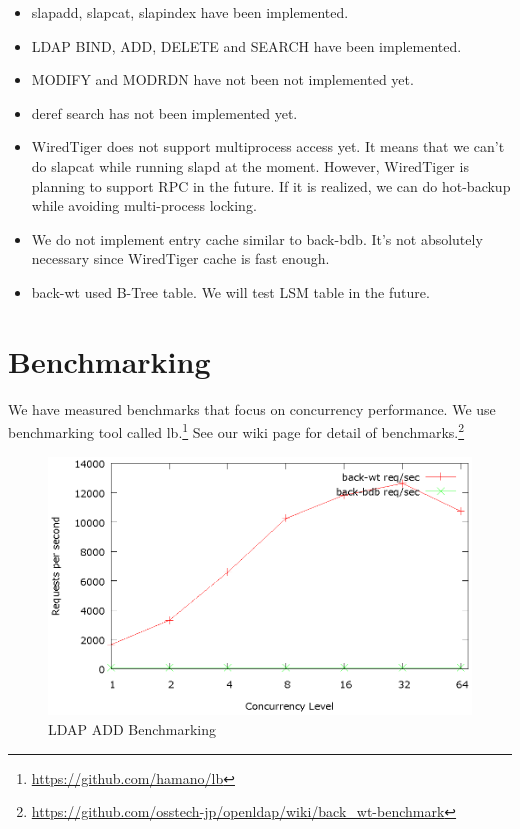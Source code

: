 \documentclass[a4paper
,12
,twocolumn
]{article}
\begin{document}
\begin{itemize}
\itemsep1pt\parskip0pt
\item
  slapadd, slapcat, slapindex have been implemented.
\item
  LDAP BIND, ADD, DELETE and SEARCH have been implemented.
\item
  MODIFY and MODRDN have not been not implemented yet.
\item
  deref search has not been implemented yet.
\item
  WiredTiger does not support multiprocess access yet. It means that we
  can't do slapcat while running slapd at the moment. However,
  WiredTiger is planning to support RPC in the future. If it is
  realized, we can do hot-backup while avoiding multi-process locking.
\item
  We do not implement entry cache similar to back-bdb. It's not
  absolutely necessary since WiredTiger cache is fast enough.
\item
  back-wt used B-Tree table. We will test LSM table in the future.
\end{itemize}

\section{Benchmarking}\label{benchmarking}

We have measured benchmarks that focus on concurrency performance. We
use benchmarking tool called lb.\footnote{\url{https://github.com/hamano/lb}}
See our wiki page for detail of benchmarks.\footnote{\url{https://github.com/osstech-jp/openldap/wiki/back_wt-benchmark}}

\begin{figure}[H]
\centering
\includegraphics[width=0.9\columnwidth]{benchmark/add.eps}
\caption{LDAP ADD Benchmarking}
\end{figure}
\end{document}
